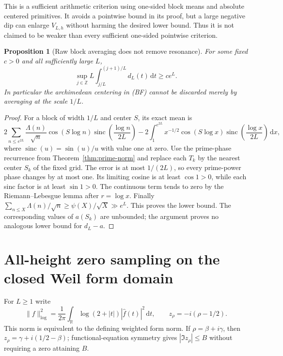 \documentclass[11pt]{article}
\newtheorem{proposition}[theorem]{Proposition}
\theoremstyle{remark}\newtheorem{remark}[theorem]{Remark}
\newcommand{\R}{\mathbb R}
\newcommand{\Z}{\mathbb Z}
\newcommand{\dd}{\,\mathrm d}
\begin{document}
This is a sufficient arithmetic criterion using one-sided
block means and absolute centered primitives. It avoids a
pointwise bound in its proof, but a large negative dip can
enlarge $V_{L,h}$ without harming the desired lower bound.
Thus it is not claimed to be weaker than every sufficient
one-sided pointwise criterion.

\begin{proposition}[Raw block averaging does not remove resonance]
\label{prop:raw-block-resonance}
For some fixed $c>0$ and all sufficiently large $L$,
\[
 \sup_{j\in\Z}L\int_{j/L}^{(j+1)/L}d_L(t)\dd t\ge ce^L.
\]
In particular the archimedean centering in (BF) cannot be
discarded merely by averaging at the scale $1/L$.
\end{proposition}
\begin{proof}
For a block of width $1/L$ and center $S$, its exact mean is
\[
 2\sum_{n\le e^{2L}}\frac{\Lambda(n)}{\sqrt n}
     \cos(S\log n)\operatorname{sinc}\!\left(\frac{\log n}{2L}\right)
 -2\int_1^{e^{2L}}x^{-1/2}\cos(S\log x)
     \operatorname{sinc}\!\left(\frac{\log x}{2L}\right)\dd x,
\]
where $\operatorname{sinc}(u)=\sin(u)/u$ with value one at zero.
Use the prime-phase recurrence from Theorem~\ref{thm:prime-norm}
and replace each $T_k$ by the nearest center $S_k$ of the fixed
grid. The error is at most $1/(2L)$, so every prime-power
phase changes by at most one. Its limiting cosine is at least
$\cos1>0$, while each sinc factor is at least $\sin1>0$.
The continuous term tends to zero by the Riemann--Lebesgue
lemma after $r=\log x$. Finally
$\sum_{n\le X}\Lambda(n)/\sqrt n\ge\psi(X)/\sqrt X\gg e^L$.
This proves the lower bound. The corresponding values of
$a(S_k)$ are unbounded; the argument proves no analogous
lower bound for $d_L-a$.
\end{proof}

\section{All-height zero sampling on the closed Weil form domain}
For $L\ge1$ write
\[
 \|f\|_{\log}^2=\frac1{2\pi}\int_\R
             \log(2+|t|)|\widehat f(t)|^2\dd t,
 \qquad z_\rho=-i(\rho-1/2).
\]
This norm is equivalent to the defining weighted form norm.
If $\rho=\beta+i\gamma$, then
$z_\rho=\gamma+i(1/2-\beta)$; functional-equation symmetry
gives $|\Im z_\rho|\le B$ without requiring a zero attaining $B$.
\end{document}
